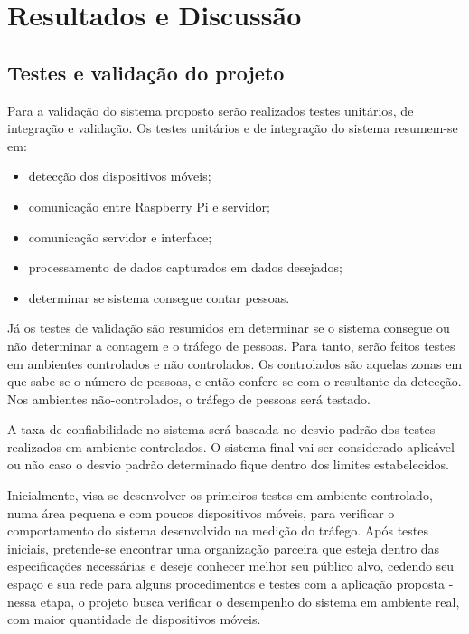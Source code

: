 \chapter{Resultados e Discussão}
\label{resultados-discussao}

\section{Testes e validação do projeto}
Para a validação do sistema proposto serão realizados testes unitários, de integração e
validação. Os testes unitários e de integração do sistema resumem-se em:

\begin{itemize}
  \item detecção dos dispositivos móveis;
  \item comunicação entre Raspberry Pi e servidor;
  \item comunicação servidor e interface;
  \item processamento de dados capturados em dados desejados;
  \item determinar se sistema consegue contar pessoas.
\end{itemize}

Já os testes de validação são resumidos em determinar se o sistema consegue ou
não determinar a contagem e o tráfego de pessoas. Para tanto, serão feitos testes em
ambientes controlados e não controlados. Os controlados são
aquelas zonas em que sabe-se o número de pessoas, e então confere-se com o resultante da
detecção. Nos ambientes não-controlados, o tráfego de pessoas será testado.

A taxa de confiabilidade no sistema será baseada no desvio padrão dos testes
realizados em ambiente controlados.
O sistema final vai ser considerado aplicável ou não caso o desvio
padrão determinado fique dentro
dos limites estabelecidos.

Inicialmente, visa-se desenvolver os primeiros testes em ambiente
controlado, numa área pequena e com poucos dispositivos móveis, para verificar o
comportamento do sistema desenvolvido na medição do tráfego. Após testes
iniciais, pretende-se encontrar uma organização parceira que esteja dentro das
especificações necessárias e deseje conhecer melhor seu público alvo, cedendo
seu espaço e sua rede para alguns procedimentos e testes com a aplicação proposta
 - nessa etapa, o projeto busca verificar o desempenho do
sistema em ambiente real, com maior quantidade de dispositivos móveis.

